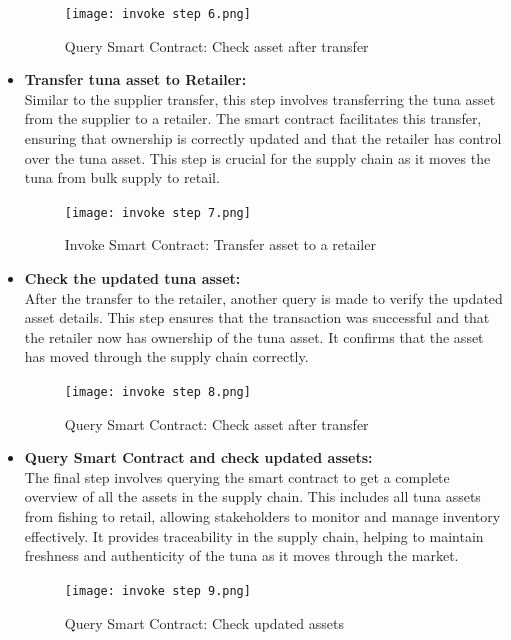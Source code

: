 \begin{itemize}
	\begin{figure}[H]
		\centering
		\texttt{[image: invoke step 6.png]}
		\caption{Query Smart Contract: Check asset after transfer}
		\label{fig: sixth step}
	\end{figure}
	
	\item \textbf{Transfer tuna asset to Retailer:}\\
	Similar to the supplier transfer, this step involves transferring the tuna asset from the supplier to a retailer. The smart contract facilitates this transfer, ensuring that ownership is correctly updated and that the retailer has control over the tuna asset. This step is crucial for the supply chain as it moves the tuna from bulk supply to retail.
	
	\begin{figure}[H]
		\centering
		\texttt{[image: invoke step 7.png]}
		\caption{Invoke Smart Contract: Transfer asset to a retailer}
		\label{fig: seventh step}
	\end{figure}
	
	\item \textbf{Check the updated tuna asset:}\\
	After the transfer to the retailer, another query is made to verify the updated asset details. This step ensures that the transaction was successful and that the retailer now has ownership of the tuna asset. It confirms that the asset has moved through the supply chain correctly.
	
	\begin{figure}[H]
		\centering
		\texttt{[image: invoke step 8.png]}
		\caption{Query Smart Contract: Check asset after transfer}
		\label{fig: eight step}
	\end{figure}
	
	\item \textbf{Query Smart Contract and check updated assets:}\\
	The final step involves querying the smart contract to get a complete overview of all the assets in the supply chain. This includes all tuna assets from fishing to retail, allowing stakeholders to monitor and manage inventory effectively. It provides traceability in the supply chain, helping to maintain freshness and authenticity of the tuna as it moves through the market.
	
	\begin{figure}[H]
		\centering
		\texttt{[image: invoke step 9.png]}
		\caption{Query Smart Contract: Check updated assets}
		\label{fig: ninth step}
	\end{figure}
	
		
	\end{itemize}
